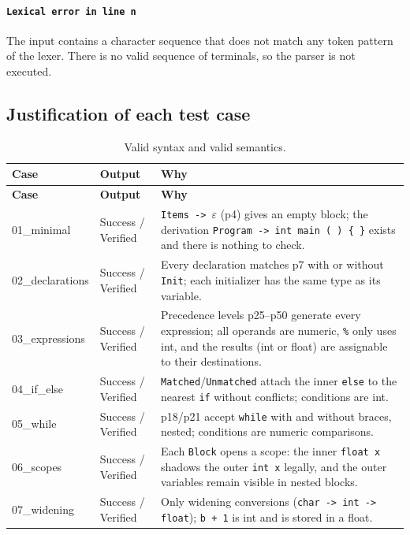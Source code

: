 \documentclass[11pt,letterpaper]{article}
\let\oldsubsection\subsection
\renewcommand{\subsection}{\needspace{6\baselineskip}\oldsubsection}
\newcommand{\bad}[1]{\textcolor{errred}{\texttt{#1}}}
\begin{document}
\paragraph{\bad{Lexical error in line n}} The input contains a character
sequence that does not match any token pattern of the lexer. There is no
valid sequence of terminals, so the parser is not executed.

\subsection{Justification of each test case}

{\small
\begin{longtable}{@{}p{3.6cm}p{2.9cm}p{8.6cm}@{}}
\caption{Valid syntax and valid semantics.}\\
\toprule
\textbf{Case} & \textbf{Output} & \textbf{Why}\\
\midrule
\endfirsthead
\toprule
\textbf{Case} & \textbf{Output} & \textbf{Why}\\
\midrule
\endhead
01\_\allowbreak{}minimal & Success / Verified & \texttt{Items -> $\varepsilon$} (p4) gives an empty block; the derivation \texttt{Program -> int main ( ) \{ \}} exists and there is nothing to check. \\
02\_\allowbreak{}declarations & Success / Verified & Every declaration matches p7 with or without \texttt{Init}; each initializer has the same type as its variable. \\
03\_\allowbreak{}expressions & Success / Verified & Precedence levels p25--p50 generate every expression; all operands are numeric, \texttt{\%} only uses int, and the results (int or float) are assignable to their destinations. \\
04\_\allowbreak{}if\_\allowbreak{}else & Success / Verified & \texttt{Matched}/\texttt{Unmatched} attach the inner \texttt{else} to the nearest \texttt{if} without conflicts; conditions are int. \\
05\_\allowbreak{}while & Success / Verified & p18/p21 accept \texttt{while} with and without braces, nested; conditions are numeric comparisons. \\
06\_\allowbreak{}scopes & Success / Verified & Each \texttt{Block} opens a scope: the inner \texttt{float x} shadows the outer \texttt{int x} legally, and the outer variables remain visible in nested blocks. \\
07\_\allowbreak{}widening & Success / Verified & Only widening conversions (\texttt{char -> int -> float}); \texttt{\textquotesingle{}b\textquotesingle{} + 1} is int and is stored in a float. \\

\end{longtable}}
\end{document}
